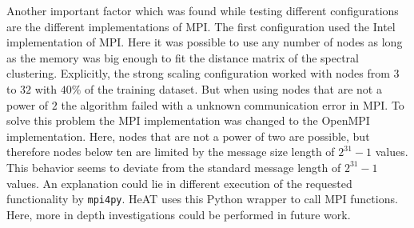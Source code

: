 Another important factor which was found while testing different configurations are the different implementations of \gls{MPI}.
The first configuration used the Intel implementation of \gls{MPI}. Here it was possible to use any number of nodes as long as
the memory was big enough to fit the distance matrix of the spectral clustering. Explicitly, the strong scaling configuration worked
with nodes from \(3\) to \(32\) with \(40\%\) of the training dataset.
But when using nodes that are not a power of \(2\) the algorithm failed with a unknown communication error in \gls{MPI}.
To solve this problem the \gls{MPI} implementation was changed to the OpenMPI implementation.
Here, nodes that are not a power of two are possible, but therefore nodes below ten are limited by the message size length of \(2^{31} - 1\) values.
This behavior seems to deviate from the standard message length of \(2^{31} - 1\) values.
An explanation could lie in different execution of the requested functionality by \lstinline{mpi4py}.
\gls{HeAT} uses this Python wrapper to call \gls{MPI} functions.
Here, more in depth investigations could be performed in future work.
